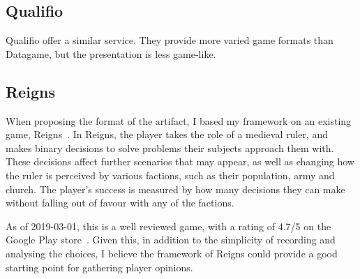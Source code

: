 \subsection{Qualifio}
Qualifio\cite{Qualifio} offer a similar service. They provide more varied game formats than Datagame, but the presentation is less game-like. 

\subsection{Reigns}
When proposing the format of the artifact, I based my framework on an existing game, Reigns~\cite{Reigns}. 
In Reigns, the player takes the role of a medieval ruler, and makes binary decisions to solve problems their subjects approach them with. 
These decisions affect further scenarios that may appear, as well as changing how the ruler is perceived by various factions, such as their population, army and church. 
The player's success is measured by how many decisions they can make without falling out of favour with any of the factions.

As of 2019-03-01, this is a well reviewed game, with a rating of 4.7/5 on the Google Play store~\cite{GooglePlay}. 
Given this, in addition to the simplicity of recording and analysing the choices, I believe the framework of Reigns could provide a good starting point for gathering player opinions. 
